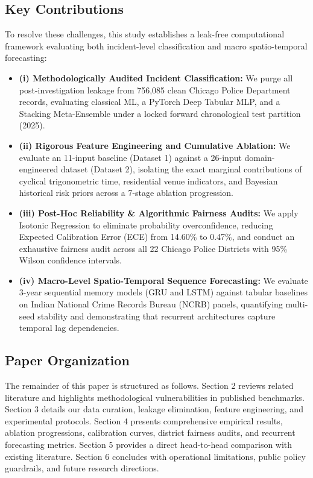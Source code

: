 \documentclass[runningheads]{llncs}
\begin{document}
\subsection{Key Contributions}
To resolve these challenges, this study establishes a leak-free computational framework evaluating both incident-level classification and macro spatio-temporal forecasting:
\begin{itemize}
    \item \textbf{(i) Methodologically Audited Incident Classification:} We purge all post-investigation leakage from 756,085 clean Chicago Police Department records, evaluating classical ML, a PyTorch Deep Tabular MLP, and a Stacking Meta-Ensemble under a locked forward chronological test partition (2025).
    \item \textbf{(ii) Rigorous Feature Engineering and Cumulative Ablation:} We evaluate an 11-input baseline (Dataset 1) against a 26-input domain-engineered dataset (Dataset 2), isolating the exact marginal contributions of cyclical trigonometric time, residential venue indicators, and Bayesian historical risk priors across a 7-stage ablation progression.
    \item \textbf{(iii) Post-Hoc Reliability \& Algorithmic Fairness Audits:} We apply Isotonic Regression to eliminate probability overconfidence, reducing Expected Calibration Error (ECE) from 14.60\% to 0.47\%, and conduct an exhaustive fairness audit across all 22 Chicago Police Districts with 95\% Wilson confidence intervals.
    \item \textbf{(iv) Macro-Level Spatio-Temporal Sequence Forecasting:} We evaluate 3-year sequential memory models (GRU and LSTM) against tabular baselines on Indian National Crime Records Bureau (NCRB) panels, quantifying multi-seed stability and demonstrating that recurrent architectures capture temporal lag dependencies.
\end{itemize}

\subsection{Paper Organization}
The remainder of this paper is structured as follows. Section 2 reviews related literature and highlights methodological vulnerabilities in published benchmarks. Section 3 details our data curation, leakage elimination, feature engineering, and experimental protocols. Section 4 presents comprehensive empirical results, ablation progressions, calibration curves, district fairness audits, and recurrent forecasting metrics. Section 5 provides a direct head-to-head comparison with existing literature. Section 6 concludes with operational limitations, public policy guardrails, and future research directions.
\end{document}
